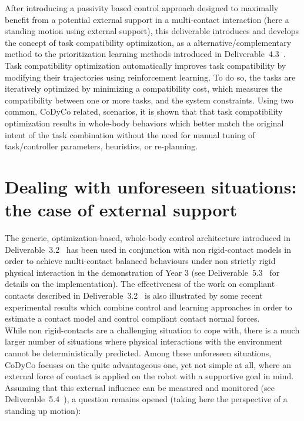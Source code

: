 \documentclass[12pt,a4paper,twoside]{article}
\begin{document}
After introducing a passivity based control approach designed to maximally benefit from a potential external support in a multi-contact interaction (here  a standing motion using external support), %
this deliverable introduces and develops the concept of task compatibility optimization, as a alternative/complementary method to the prioritization learning methods introduced in Deliverable~4.3~\cite{deliverable43}. Task compatibility optimization automatically improves task compatibility by modifying their trajectories using reinforcement learning. To do so, the tasks are iteratively optimized by minimizing a compatibility cost, which measures the compatibility between one or more tasks, and the system constraints. Using two common, CoDyCo related, scenarios, it is shown that that task compatibility optimization results in whole-body behaviors which better match the original intent of the task combination without the need for manual tuning of task/controller parameters, heuristics, or re-planning.

\section{Dealing with unforeseen situations: the case of external support}
\label{sec:controller}

%

The generic, optimization-based, whole-body control architecture introduced in Deliverable~3.2~\cite{deliverable32} has been used in conjunction with non rigid-contact models in order to achieve multi-contact balanced behaviours under non strictly rigid physical interaction in the demonstration of Year 3 (see Deliverable~5.3~\cite{deliverable53} for details on the implementation). The effectiveness of the work on compliant contacts described in Deliverable~3.2~\cite{deliverable32} is also illustrated by some recent experimental results \underline{\bf \cite{Azad_2016_Humanoids}} which combine control and learning approaches in order to  estimate a contact model and control compliant contact normal forces.\\

While non rigid-contacts are a challenging situation to cope with, there is a much larger number of situations where physical interactions with the environment cannot be deterministically predicted. Among these unforeseen situations, CoDyCo focuses on the quite advantageous one, yet not simple at all, where an external force of contact is applied on the robot with a supportive goal in mind. Assuming that this external influence can be measured and monitored (see Deliverable~5.4~\cite{deliverable54}), a question remains opened (taking here the perspective of a standing up motion):
\end{document}

